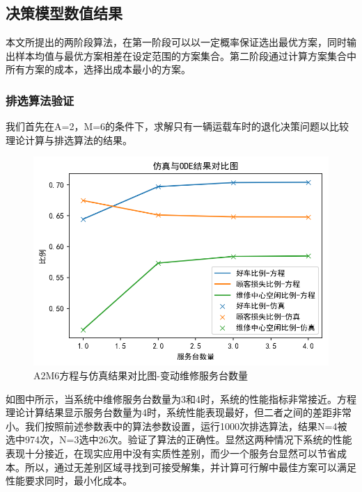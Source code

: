 \documentclass{article}
\begin{document}
\subsection{决策模型数值结果}
本文所提出的两阶段算法，在第一阶段可以以一定概率保证选出最优方案，同时输出样本均值与最优方案相差在设定范围的方案集合。第二阶段通过计算方案集合中所有方案的成本，选择出成本最小的方案。
\subsubsection{排选算法验证}
我们首先在A=2，M=6的条件下，求解只有一辆运载车时的退化决策问题以比较理论计算与排选算法的结果。
\begin{figure}[H]
    \centering
    \includegraphics[scale=0.5]{A2M6仿真-odeSingleVaryN.png}
    \caption{A2M6方程与仿真结果对比图-变动维修服务台数量}
    \label{fig:cenmodel}
\end{figure}
如图中所示，当系统中维修服务台数量为3和4时，系统的性能指标非常接近。方程理论计算结果显示服务台数量为4时，系统性能表现最好，但二者之间的差距非常小。我们按照前述参数表中的算法参数设置，运行1000次排选算法，结果N=4被选中974次，N=3选中26次。验证了算法的正确性。显然这两种情况下系统的性能表现十分接近，在现实应用中没有实质性差别，而少一个服务台显然可以节省成本。所以，通过无差别区域寻找到可接受解集，并计算可行解中最佳方案可以满足性能要求同时，最小化成本。
\end{document}
